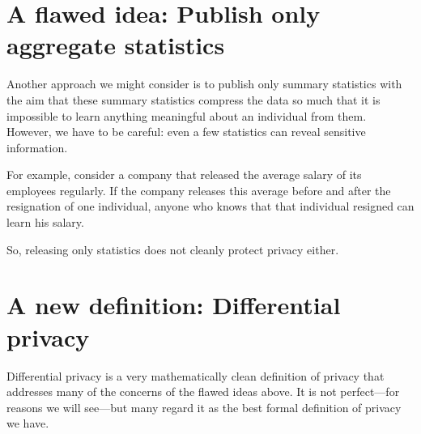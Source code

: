 \section{A flawed idea: Publish only aggregate statistics}
Another approach we might consider is to publish only summary statistics with the aim that these summary statistics compress the data so much that it is impossible to learn anything meaningful about an individual from them. However, we have to be careful: even a few statistics can reveal sensitive information.

For example, consider a company that released the average salary of its employees regularly. If the company releases this average before and after the resignation of one individual, anyone who knows that that individual resigned can learn his salary.

So, releasing only statistics does not cleanly protect privacy either. 

\section{A new definition: Differential privacy}
\label{sec:dp:defn}

Differential privacy is a very mathematically clean definition of privacy that addresses
many of the concerns of the flawed ideas above.
It is not perfect---for reasons we will see---but many regard it as 
the best formal definition of privacy we have.

